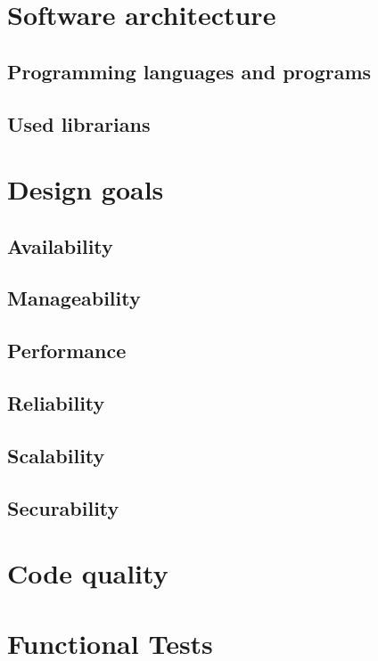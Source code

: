 \documentclass[a4paper]{article}
\begin{document}
\section{Software architecture}

\subsection{Programming languages and programs}

\subsection{Used librarians}


\section{Design goals}

\subsection{Availability}

\subsection{Manageability}

\subsection{Performance}

\subsection{Reliability}

\subsection{Scalability}

\subsection{Securability}


\section{Code quality}


\section{Functional Tests}
\end{document}
